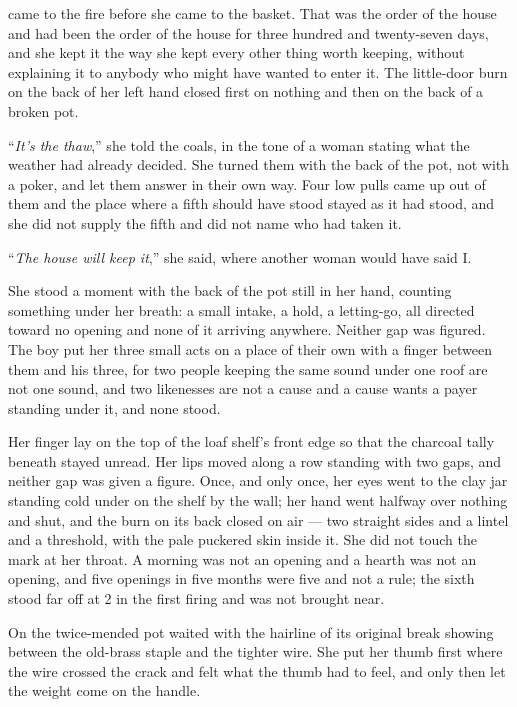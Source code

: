  came to the fire before she came to the basket. That was the order of the house and had been the order of the house for three hundred and twenty-seven days, and she kept it the way she kept every other thing worth keeping, without explaining it to anybody who might have wanted to enter it. The little-door burn on the back of her left hand closed first on nothing and then on the back of a broken pot.

“\emph{It's the thaw},” she told the coals, in the tone of a woman stating what the weather had already decided. She turned them with the back of the pot, not with a poker, and let them answer in their own way. Four low pulls came up out of them and the place where a fifth should have stood stayed as it had stood, and she did not supply the fifth and did not name who had taken it.

“\emph{The house will keep it},” she said, where another woman would have said I.

She stood a moment with the back of the pot still in her hand, counting something under her breath: a small intake, a hold, a letting-go, all directed toward no opening and none of it arriving anywhere. Neither gap was figured. The boy put her three small acts on a place of their own with a finger between them and his three, for two people keeping the same sound under one roof are not one sound, and two likenesses are not a cause and a cause wants a payer standing under it, and none stood.

Her finger lay on the top of the loaf shelf's front edge so that the charcoal tally beneath stayed unread. Her lips moved along a row standing with two gaps, and neither gap was given a figure. Once, and only once, her eyes went to the clay jar standing cold under  on the shelf by the wall; her hand went halfway over nothing and shut, and the burn on its back closed on air — two straight sides and a lintel and a threshold, with the pale puckered skin inside it. She did not touch the mark at her throat. A morning was not an opening and a hearth was not an opening, and five openings in five months were five and not a rule; the sixth stood far off at  2 in the first firing and was not brought near.

On  the twice-mended pot waited with the hairline of its original break showing between the old-brass staple and the tighter wire. She put her thumb first where the wire crossed the crack and felt what the thumb had to feel, and only then let the weight come on the handle.

